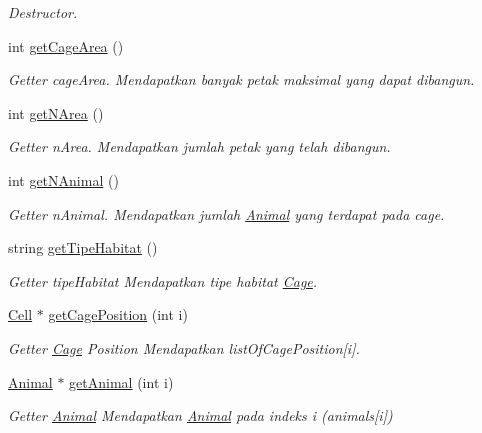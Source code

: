 \begin{DoxyCompactItemize}
\begin{DoxyCompactList}\small\item\em Destructor. \end{DoxyCompactList}\item 
int \hyperlink{classCage_a095e180cfe3c617f14ba102cb1c99f07}{get\-Cage\-Area} ()
\begin{DoxyCompactList}\small\item\em Getter cage\-Area. Mendapatkan banyak petak maksimal yang dapat dibangun. \end{DoxyCompactList}\item 
int \hyperlink{classCage_a782080ce97d84f0ddfdc46f4c11e1cdf}{get\-N\-Area} ()
\begin{DoxyCompactList}\small\item\em Getter n\-Area. Mendapatkan jumlah petak yang telah dibangun. \end{DoxyCompactList}\item 
int \hyperlink{classCage_af67deefc75632b3d13007cb5f06109b8}{get\-N\-Animal} ()
\begin{DoxyCompactList}\small\item\em Getter n\-Animal. Mendapatkan jumlah \hyperlink{classAnimal}{Animal} yang terdapat pada cage. \end{DoxyCompactList}\item 
string \hyperlink{classCage_a762b5f166b260fadf7b6fd21e231c02b}{get\-Tipe\-Habitat} ()
\begin{DoxyCompactList}\small\item\em Getter tipe\-Habitat Mendapatkan tipe habitat \hyperlink{classCage}{Cage}. \end{DoxyCompactList}\item 
\hyperlink{classCell}{Cell} $\ast$ \hyperlink{classCage_a501c11daaeee7968a477412ec00c140e}{get\-Cage\-Position} (int i)
\begin{DoxyCompactList}\small\item\em Getter \hyperlink{classCage}{Cage} Position Mendapatkan list\-Of\-Cage\-Position\mbox{[}i\mbox{]}. \end{DoxyCompactList}\item 
\hyperlink{classAnimal}{Animal} $\ast$ \hyperlink{classCage_aa3e42c058261cdc8da4479afe1342dc7}{get\-Animal} (int i)
\begin{DoxyCompactList}\small\item\em Getter \hyperlink{classAnimal}{Animal} Mendapatkan \hyperlink{classAnimal}{Animal} pada indeks i (animals\mbox{[}i\mbox{]}) \end{DoxyCompactList}\item 

\end{DoxyCompactItemize}
